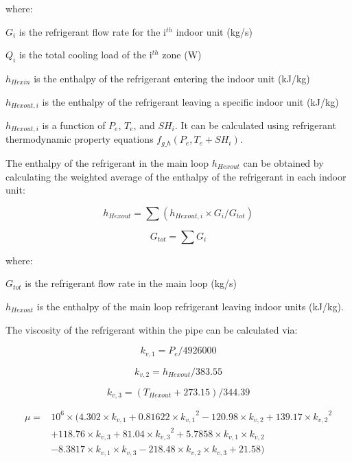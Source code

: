 where:

$G_i$ is the refrigerant flow rate for the i\(^{th}\) indoor unit (kg/s)

$Q_i$ is the total cooling load of the i\(^{th}\) zone (W)

$h_{Hexin}$ is the enthalpy of the refrigerant entering the indoor unit (kJ/kg)

$h_{Hexout,i}$ is the enthalpy of the refrigerant leaving a specific indoor unit (kJ/kg)

$h_{Hexout,i}$ is a function of $P_e$, $T_e$, and $SH_i$. It can be calculated using refrigerant thermodynamic property equations $f_{g\_h}(P_e,T_e+SH_i)$.

The enthalpy of the refrigerant in the main loop $h_{Hexout}$ can be obtained by calculating the weighted average of the enthalpy of the refrigerant in each indoor unit:

\begin{equation}
  h_{Hexout}=\sum(h_{Hexout,i}\times{G_i}/{G_{tot}})
\end{equation}

\begin{equation}
  G_{tot}=\sum{G_i}
\end{equation}

where:

$G_{tot}$ is the refrigerant flow rate in the main loop (kg/s)

$h_{Hexout}$ is the enthalpy of the main loop refrigerant leaving indoor units (kJ/kg).

The viscosity of the refrigerant within the pipe can be calculated via:

\begin{equation}
  k_{v,1}=P_e/4926000
\end{equation}

\begin{equation}
  k_{v,2}=h_{Hexout}/383.55
\end{equation}

\begin{equation}
  k_{v,3}=(T_{Hexout}+273.15)/344.39
\end{equation}

\begin{equation}
\begin{array}{rl}
\mu =& 10^6\times(4.302\times{k_{v,1}}+0.81622\times{k_{v,1}}^2-120.98\times{k_{v,2}}+139.17\times{k_{v,2}}^2 \\
 & +118.76\times{k_{v,3}}+81.04\times{k_{v,3}}^2+5.7858\times{k_{v,1}}\times{k_{v,2}} \\
 & -8.3817\times{k_{v,1}}\times{k_{v,3}}-218.48\times{k_{v,2}}\times{k_{v,3}}+21.58)
\end{array}
\end{equation}

